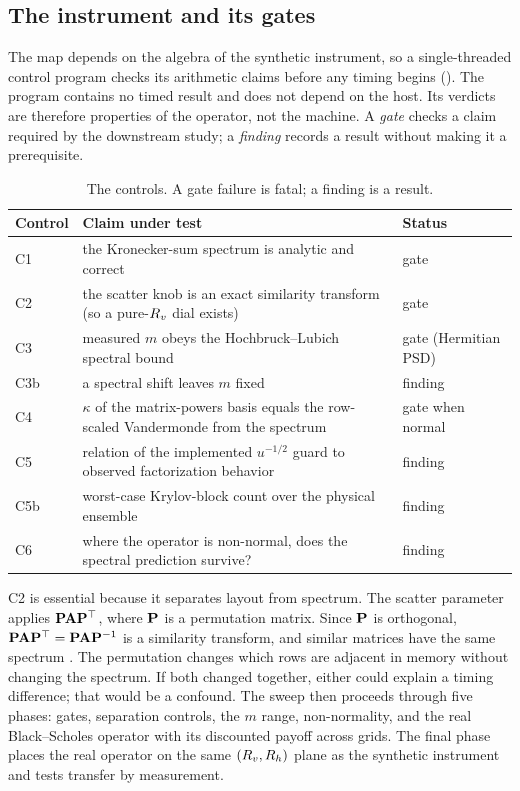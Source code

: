 \subsection{The instrument and its gates}\label{sec:gates}

The map depends on the algebra of the synthetic instrument, so a single-threaded control program checks its arithmetic claims before any timing begins (). The program contains no timed result and does not depend on the host. Its verdicts are therefore properties of the operator, not the machine. A \emph{gate} checks a claim required by the downstream study; a \emph{finding} records a result without making it a prerequisite.

\begin{table}[htbp!]
\centering
\caption{The controls. A gate failure is fatal; a finding is a result.}
\label{tab:gates}
\begin{tabular}{@{}lp{9.2cm}l@{}}
\toprule
\textbf{Control} & \textbf{Claim under test} & \textbf{Status} \\
\midrule
C1  & the Kronecker-sum spectrum is analytic and correct & gate \\
C2  & the scatter knob is an exact similarity transform (so a pure-$R_v$ dial exists) & gate \\
C3  & measured $m$ obeys the Hochbruck--Lubich spectral bound \cite{hochbruck-lubich-1997} & gate (Hermitian PSD) \\
C3b & a spectral shift leaves $m$ fixed & finding \\
C4  & $\kappa$ of the matrix-powers basis equals the row-scaled Vandermonde from the spectrum & gate when normal \\
C5  & relation of the implemented $u^{-1/2}$ guard to observed factorization behavior & finding \\
C5b & worst-case Krylov-block count over the physical ensemble & finding \\
C6  & where the operator is non-normal, does the spectral prediction survive? & finding \\
\bottomrule
\end{tabular}
\end{table}

C2 is essential because it separates layout from spectrum. The scatter parameter applies $\mathbf{P}\mathbf{A}\mathbf{P}^\top$, where $\mathbf{P}$ is a permutation matrix. Since $\mathbf{P}$ is orthogonal, $\mathbf{P}\mathbf{A}\mathbf{P}^\top=\mathbf{P}\mathbf{A}\mathbf{P}^{-1}$ is a similarity transform, and similar matrices have the same spectrum \cite{golub-vanloan-2013,trefethen-1997}. The permutation changes which rows are adjacent in memory without changing the spectrum. If both changed together, either could explain a timing difference; that would be a confound. The sweep then proceeds through five phases: gates, separation controls, the $m$ range, non-normality, and the real Black--Scholes operator with its discounted payoff across grids. The final phase places the real operator on the same $(R_v,R_h)$ plane as the synthetic instrument and tests transfer by measurement.

